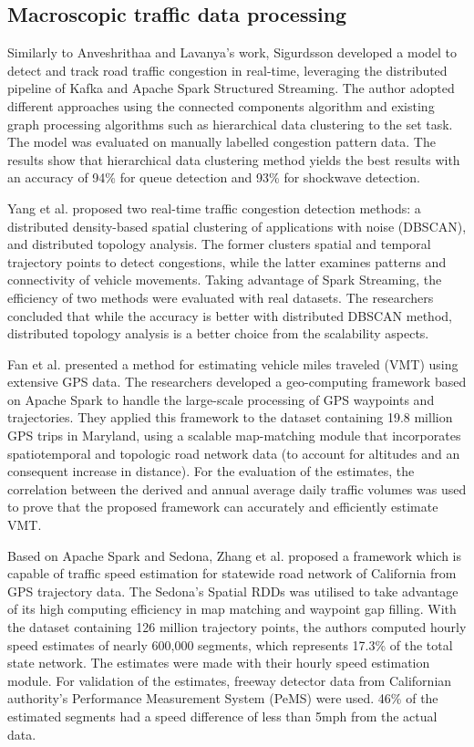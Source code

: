 \documentclass[11pt]{uonthesis}
\begin{document}
\subsection{Macroscopic traffic data processing}
Similarly to Anveshrithaa and Lavanya's work, Sigurdsson\cite{Sigurdsson2018RoadTC} developed a model to detect and track road traffic congestion in real-time, leveraging the distributed pipeline of Kafka and Apache Spark Structured Streaming. The author adopted different approaches using the connected components algorithm and existing graph processing algorithms such as hierarchical data clustering to the set task. The model was evaluated on manually labelled congestion pattern data. The results show that hierarchical data clustering method yields the best results with an accuracy of 94\% for queue detection and 93\% for shockwave detection. 

Yang et al.\cite{Yang2019} proposed two real-time traffic congestion detection methods: a distributed density-based spatial clustering of applications with noise (DBSCAN), and distributed topology analysis. The former clusters spatial and temporal trajectory points to detect congestions, while the latter examines patterns and connectivity of vehicle movements. Taking advantage of Spark Streaming, the efficiency of two methods were evaluated with real datasets. The researchers concluded that while the accuracy is better with distributed DBSCAN method, distributed topology analysis is a better choice from the scalability aspects.

Fan et al.\cite{FAN2019298} presented a method for estimating vehicle miles traveled (VMT) using extensive GPS data. The researchers developed a geo-computing framework based on Apache Spark to handle the large-scale processing of GPS waypoints and trajectories. They applied this framework to the dataset containing 19.8 million GPS trips in Maryland, using a scalable map-matching module that incorporates spatiotemporal and topologic road network data (to account for altitudes and an consequent increase in distance). For the evaluation of the estimates, the correlation between the derived and annual average daily traffic volumes was used to prove that the proposed framework can accurately and efficiently estimate VMT.

Based on Apache Spark and Sedona, Zhang et al.\cite{Zhang20231124} proposed a framework which is capable of traffic speed estimation for statewide road network of California from GPS trajectory data. The Sedona's Spatial RDDs was utilised to take advantage of its high computing efficiency in map matching and waypoint gap filling. With the dataset containing 126 million trajectory points, the authors computed hourly speed estimates of nearly 600,000 segments, which represents 17.3\% of the total state network. The estimates were made with their hourly speed estimation module. For validation of the estimates, freeway detector data from Californian authority's Performance Measurement System (PeMS) were used. 46\% of the estimated segments had a speed difference of less than 5mph from the actual data. 
\end{document}
